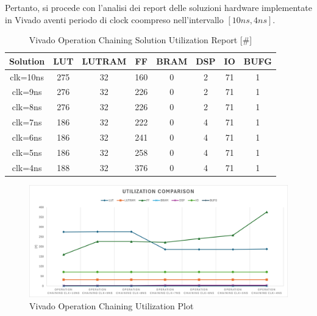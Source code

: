 Pertanto, si procede con l'analisi dei report delle soluzioni hardware implementate in Vivado aventi periodo di clock coompreso nell'intervallo $[10ns,4ns]$.

\begin{table}[H]
    \centering
    \begin{tabular}{|c|c|c|c|c|c|c|c|}
        \hline
        \textbf{Solution} & \textbf{LUT} & \textbf{LUTRAM} & \textbf{FF} & \textbf{BRAM} & \textbf{DSP} & \textbf{IO} & \textbf{BUFG} \\
        \hline
        clk=10ns & 275 & 32 & 160 & 0 & 2 & 71 & 1 \\
        \hline
        clk=9ns & 276 & 32 & 226 & 0 & 2 & 71 & 1 \\
        \hline
        clk=8ns & 276 & 32 & 226 & 0 & 2 & 71 & 1 \\
        \hline
        clk=7ns & 186 & 32 & 222 & 0 & 4 & 71 & 1 \\
        \hline
        clk=6ns & 186 & 32 & 241 & 0 & 4 & 71 & 1 \\
        \hline
        clk=5ns & 186 & 32 & 258 & 0 & 4 & 71 & 1 \\
        \hline
        clk=4ns & 188 & 32 & 376 & 0 & 4 & 71 & 1 \\
        \hline
    \end{tabular}
    \caption{Vivado Operation Chaining Solution Utilization Report [\#]}
    \label{tab:vivado-operation-chaining-utilization-report}
\end{table}

\begin{figure}[H]
    \centering
    \includegraphics[width=\textwidth]{solutions/operation_chaining/operationchainingutilization.png}
    \caption{Vivado Operation Chaining Utilization Plot}
    \label{fig:vivado-operation-chaining-utilization-plot}
\end{figure}

